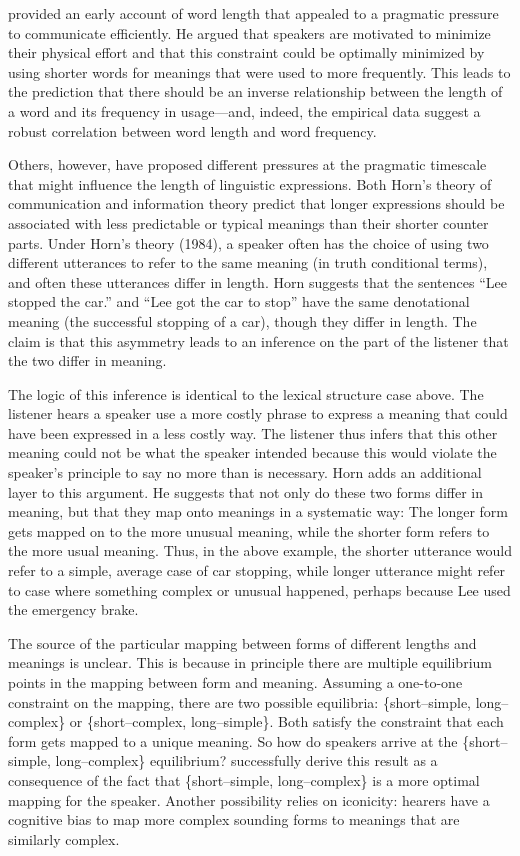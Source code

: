 \documentclass[man]{apa2}
\begin{document}
 provided an early account of word length that appealed to a pragmatic pressure to communicate efficiently. He argued that speakers are motivated to minimize their physical effort and that this constraint could be optimally minimized by using shorter words for meanings that were used to more frequently. This leads to the prediction that there should be an inverse relationship between the length of a word and its frequency in usage---and, indeed, the empirical data suggest a robust correlation between word length and word frequency.

Others, however, have proposed different pressures at the pragmatic timescale that might influence the length of linguistic expressions. Both Horn's theory of communication and information theory predict that longer expressions should be associated with less predictable or typical meanings than their shorter counter parts. Under Horn's theory (1984), a speaker often has the choice of using two different utterances to refer to the same meaning (in truth conditional terms), and often these utterances differ in length. Horn suggests that the sentences ``Lee stopped the car.'' and ``Lee got the car to stop'' have the same denotational meaning (the successful stopping of a car), though they differ in length. The claim is that this asymmetry leads to an inference on the part of the listener that the two differ in meaning.

The logic of this inference is identical to the lexical structure case above. The listener hears a speaker use a more costly phrase to express a meaning that could have been expressed in a less costly way. The listener thus infers that this other meaning could not be what the speaker intended because this would violate the speaker's principle to say no more than is necessary. Horn adds an additional layer to this argument. He suggests that not only do these two forms differ in meaning, but that they map onto meanings in a systematic way: The longer form gets mapped on to the more unusual meaning, while the shorter form refers to the more usual meaning. Thus, in the above example, the shorter utterance would refer to a simple, average case of car stopping, while longer utterance might refer to case where something complex or unusual happened, perhaps because Lee used the emergency brake.

The source of the particular mapping between forms of different lengths and meanings is unclear. This is because in principle there are multiple equilibrium points in the mapping between form and meaning. Assuming a one-to-one constraint on the mapping, there are two possible equilibria: \{short--simple, long--complex\} or \{short--complex, long--simple\}. Both satisfy the constraint that each form gets mapped to a unique meaning. So how do speakers arrive at the \{short--simple, long--complex\} equilibrium?  successfully derive this result as a consequence of the fact that \{short--simple, long--complex\} is a more optimal mapping for the speaker. Another possibility relies on iconicity: hearers have a cognitive bias to map more complex sounding forms to meanings that are similarly complex.
\end{document}
